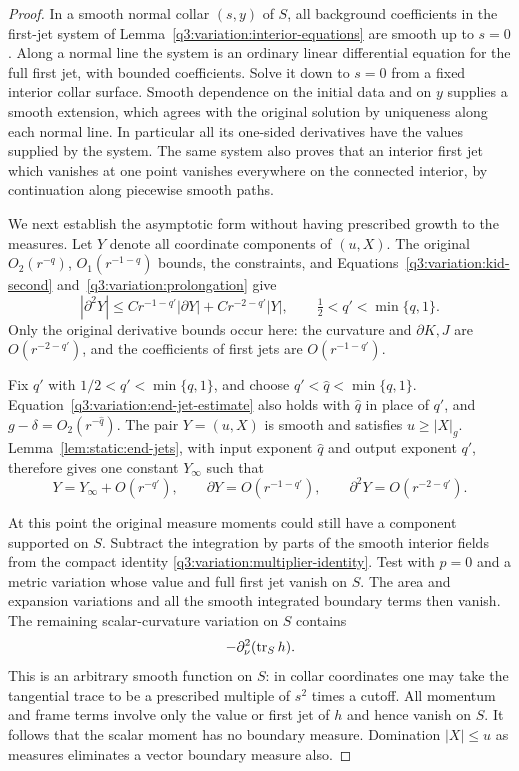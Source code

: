 \begin{proof}
In a smooth normal collar $(s,y)$ of $S$, all background coefficients
in the first-jet system of Lemma~\ref{q3:variation:interior-equations}
are smooth up to $s=0$.  Along a normal line the system is an ordinary
linear differential equation for the full first jet, with bounded
coefficients.  Solve it down to $s=0$ from a fixed interior collar
surface.  Smooth dependence on the initial data and on $y$ supplies
a smooth extension, which agrees with the original solution by
uniqueness along each normal line.  In particular all its one-sided
derivatives have the values supplied by the system.  The same system
also proves that an interior first jet which vanishes at one point
vanishes everywhere on the connected interior, by continuation
along piecewise smooth paths.

We next establish the asymptotic form without having prescribed
growth to the measures.  Let $Y$ denote all coordinate components
of $(u,X)$.  The original $O_2(r^{-q})$, $O_1(r^{-1-q})$ bounds,
the constraints, and Equations~\eqref{q3:variation:kid-second}
and~\eqref{q3:variation:prolongation} give
\begin{equation}
 |\partial^2Y|
    \le C r^{-1-q'}|\partial Y|
          +C r^{-2-q'}|Y|,
 \qquad \tfrac12<q'<\min\{q,1\}.
 \label{q3:variation:end-jet-estimate}
\end{equation}
Only the original derivative bounds occur here: the curvature and
$\partial K,J$ are $O(r^{-2-q'})$, and the coefficients of first
jets are $O(r^{-1-q'})$.

Fix $q'$ with $1/2<q'<\min\{q,1\}$, and choose
$q'<\widehat q<\min\{q,1\}$.
Equation~\eqref{q3:variation:end-jet-estimate} also holds with
$\widehat q$ in place of $q'$, and
$g-\delta=O_2(r^{-\widehat q})$.
The pair $Y=(u,X)$ is smooth and satisfies $u\geq|X|_g$.
Lemma~\ref{lem:static:end-jets}, with input exponent
$\widehat q$ and output exponent $q'$, therefore gives one
constant $Y_\infty$ such that
\begin{equation}
 Y=Y_\infty+O(r^{-q'}),\qquad
 \partial Y=O(r^{-1-q'}),\qquad
 \partial^2Y=O(r^{-2-q'}).
 \label{q3:variation:unnormalized-asymptote}
\end{equation}

At this point the original measure moments could still have a
component supported on $S$.  Subtract the integration by parts of
the smooth interior fields from the compact identity
\eqref{q3:variation:multiplier-identity}.  Test with $p=0$ and a metric
variation whose value and full first jet vanish on $S$.  The area
and expansion variations and all the smooth integrated boundary
terms then vanish.  The remaining scalar-curvature variation on
$S$ contains
\[
 -\partial_\nu^2(\operatorname{tr}_S h).
\]
This is an arbitrary smooth function on $S$: in collar coordinates
one may take the tangential trace to be a prescribed multiple of
$s^2$ times a cutoff.  All momentum and frame terms involve only
the value or first jet of $h$ and hence vanish on $S$.  It follows
that the scalar moment has no boundary measure.  Domination
$|X|\le u$ as measures eliminates a vector boundary measure also.


\end{proof}
